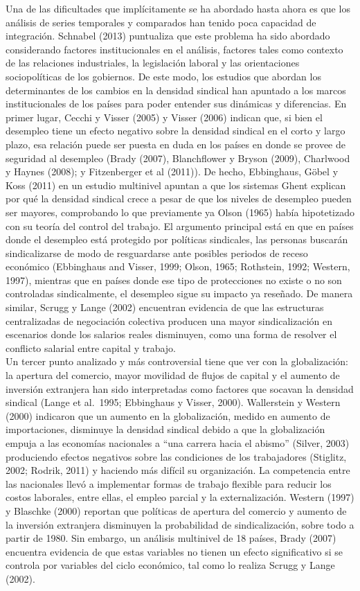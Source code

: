 \documentclass[
]{book}
\begin{document}
Una de las dificultades que implícitamente se ha abordado hasta ahora es que los análisis de series temporales y comparados han tenido poca capacidad de integración. Schnabel (2013) puntualiza que este problema ha sido abordado considerando factores institucionales en el análisis, factores tales como contexto de las relaciones industriales, la legislación laboral y las orientaciones sociopolíticas de los gobiernos. De este modo, los estudios que abordan los determinantes de los cambios en la densidad sindical han apuntado a los marcos institucionales de los países para poder entender sus dinámicas y diferencias.
En primer lugar, Cecchi y Visser (2005) y Visser (2006) indican que, si bien el desempleo tiene un efecto negativo sobre la densidad sindical en el corto y largo plazo, esa relación puede ser puesta en duda en los países en donde se provee de seguridad al desempleo (Brady (2007), Blanchflower y Bryson (2009), Charlwood y Haynes (2008); y Fitzenberger et al (2011)). De hecho, Ebbinghaus, Göbel y Koss (2011) en un estudio multinivel apuntan a que los sistemas Ghent explican por qué la densidad sindical crece a pesar de que los niveles de desempleo pueden ser mayores, comprobando lo que previamente ya Olson (1965) había hipotetizado con su teoría del control del trabajo. El argumento principal está en que en países donde el desempleo está protegido por políticas sindicales, las personas buscarán sindicalizarse de modo de resguardarse ante posibles periodos de receso económico (Ebbinghaus and Visser, 1999; Olson, 1965; Rothstein, 1992; Western, 1997), mientras que en países donde ese tipo de protecciones no existe o no son controladas sindicalmente, el desempleo sigue su impacto ya reseñado. De manera similar, Scrugg y Lange (2002) encuentran evidencia de que las estructuras centralizadas de negociación colectiva producen una mayor sindicalización en escenarios donde los salarios reales disminuyen, como una forma de resolver el conflicto salarial entre capital y trabajo.\\
Un tercer punto analizado y más controversial tiene que ver con la globalización: la apertura del comercio, mayor movilidad de flujos de capital y el aumento de inversión extranjera han sido interpretadas como factores que socavan la densidad sindical (Lange et al.~1995; Ebbinghaus y Visser, 2000). Wallerstein y Western (2000) indicaron que un aumento en la globalización, medido en aumento de importaciones, disminuye la densidad sindical debido a que la globalización empuja a las economías nacionales a ``una carrera hacia el abismo'' (Silver, 2003) produciendo efectos negativos sobre las condiciones de los trabajadores (Stiglitz, 2002; Rodrik, 2011) y haciendo más difícil su organización. La competencia entre las nacionales llevó a implementar formas de trabajo flexible para reducir los costos laborales, entre ellas, el empleo parcial y la externalización. Western (1997) y Blaschke (2000) reportan que políticas de apertura del comercio y aumento de la inversión extranjera disminuyen la probabilidad de sindicalización, sobre todo a partir de 1980. Sin embargo, un análisis multinivel de 18 países, Brady (2007) encuentra evidencia de que estas variables no tienen un efecto significativo si se controla por variables del ciclo económico, tal como lo realiza Scrugg y Lange (2002).
\end{document}
